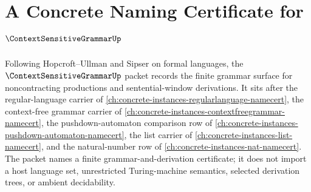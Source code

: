 \chapter{A Concrete Naming Certificate for $\ContextSensitiveGrammarUp$}
\label{ch:concrete-instances-context-sensitive-grammar-namecert}

Following Hopcroft--Ullman and Sipser on formal languages, the $\ContextSensitiveGrammarUp$ packet records the finite grammar surface for noncontracting productions and sentential-window derivations. It sits after the regular-language carrier of \autoref{ch:concrete-instances-regularlanguage-namecert}, the context-free grammar carrier of \autoref{ch:concrete-instances-contextfreegrammar-namecert}, the pushdown-automaton comparison row of \autoref{ch:concrete-instances-pushdown-automaton-namecert}, the list carrier of \autoref{ch:concrete-instances-list-namecert}, and the natural-number row of \autoref{ch:concrete-instances-nat-namecert}. The packet names a finite grammar-and-derivation certificate; it does not import a host language set, unrestricted Turing-machine semantics, selected derivation trees, or ambient decidability.

